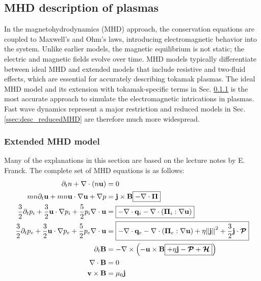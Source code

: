 \subsection{MHD description of plasmas}
\label{sec:desc_MHD}
In the magnetohydrodynamics (MHD) approach, the conservation equations are coupled to Maxwell's and Ohm's laws, introducing electromagnetic behavior into the system. Unlike earlier models, the magnetic equilibrium is not static; the electric and magnetic fields evolve over time. MHD models typically differentiate between ideal MHD and extended models that include resistive and two-fluid effects, which are essential for accurately describing tokamak plasmas. The ideal MHD model and its extension with tokamak-specific terms in Sec. \ref{ssec:desc_extendedMHD} is the most accurate approach to simulate the electromagnetic intrications in plasmas. Fast wave dynamics represent a major restriction and reduced models in Sec. \ref{ssec:desc_reducedMHD} are therefore much more widespread. 

\subsubsection{Extended MHD model}
\label{ssec:desc_extendedMHD}
Many of the explanations in this section are based on the lecture notes by E. Franck\cite{lessig2016fluid}. The complete set of MHD equations is as follows:
\begin{align}
	\partial_t n + \nabla \cdot (n \mathbf{u}) &= 0 \label{eq:desc_MHDmass} \\
	mn\partial_t\mathbf{u} + mn\mathbf{u}\cdot\nabla\mathbf{u} + \nabla p &= \mathbf{j} \times \mathbf{B} \boxed{- \nabla \cdot \boldsymbol{\Pi}} \label{eq:desc_MHDmomentum} \\
	\frac{3}{2}\partial_t p_i + \frac{3}{2} \mathbf{u} \cdot \nabla p_i + \frac{5}{2}p_i \nabla \cdot \mathbf{u} &= \boxed{- \nabla \cdot \mathbf{q}_i - \nabla \cdot (\boldsymbol{\Pi}_i : \nabla \mathbf{u})} \label{eq:desc_MHDionpressure} \\
	\frac{3}{2}\partial_t p_e + \frac{3}{2} \mathbf{u} \cdot \nabla p_e + \frac{5}{2}p_e \nabla \cdot \mathbf{u}  &= \boxed{- \nabla \cdot \mathbf{q}_e - \nabla \cdot (\boldsymbol{\Pi}_e : \nabla \mathbf{u}) + \eta \norm{\mathbf{j}}^2 + \frac{3}{2}\mathbf{j}\cdot \bm{\mathcal{P}}} \label{eq:desc_MHDelectronpressure} \\
	\partial_t \mathbf{B} &= -\nabla \times \left(-\mathbf{u} \times \mathbf{B} \boxed{+ \eta \mathbf{j} - \bm{\mathcal{P}} + \bm{\mathcal{H}}}\right) \label{eq:desc_MHDohmlaw} \\
	\nabla \cdot \mathbf{B} &= 0 \label{eq:desc_MHDgausslaw} \\
	\textbf{v} \times \mathbf{B} &= \mu_0 \mathbf{j} \label{eq:desc_MHDamperelaw}
\end{align}

